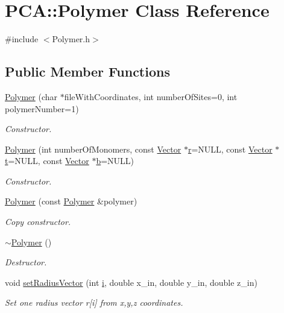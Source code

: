 \hypertarget{class_p_c_a_1_1_polymer}{}\section{P\+CA\+:\+:Polymer Class Reference}
\label{class_p_c_a_1_1_polymer}


{\ttfamily \#include $<$Polymer.\+h$>$}

\subsection*{Public Member Functions}
\begin{DoxyCompactItemize}
\item 
\hyperlink{class_p_c_a_1_1_polymer_a0553d45df48e7f0995063e9e74fcadb5}{Polymer} (char $\ast$file\+With\+Coordinates, int number\+Of\+Sites=0, int polymer\+Number=1)
\begin{DoxyCompactList}\small\item\em Constructor. \end{DoxyCompactList}\item 
\hyperlink{class_p_c_a_1_1_polymer_ac2645c33eba98a8ec1670d69b92060c8}{Polymer} (int number\+Of\+Monomers, const \hyperlink{class_p_c_a_1_1_vector}{Vector} $\ast$\hyperlink{class_p_c_a_1_1_polymer_a9822e3b9c3420a04a689706b84e586ca}{r}=N\+U\+LL, const \hyperlink{class_p_c_a_1_1_vector}{Vector} $\ast$\hyperlink{class_p_c_a_1_1_polymer_a0fd79e19a8c09a9e4c72903924151b5e}{t}=N\+U\+LL, const \hyperlink{class_p_c_a_1_1_vector}{Vector} $\ast$\hyperlink{class_p_c_a_1_1_polymer_ad93199b0187ab557476153b204b921c7}{b}=N\+U\+LL)
\begin{DoxyCompactList}\small\item\em Constructor. \end{DoxyCompactList}\item 
\hyperlink{class_p_c_a_1_1_polymer_a1ce99540db06e9e48392423ba516cd2f}{Polymer} (const \hyperlink{class_p_c_a_1_1_polymer}{Polymer} \&polymer)
\begin{DoxyCompactList}\small\item\em Copy constructor. \end{DoxyCompactList}\item 
\hyperlink{class_p_c_a_1_1_polymer_ac0d31fa5c6bee720f8069805d6669606}{$\sim$\+Polymer} ()
\begin{DoxyCompactList}\small\item\em Destructor. \end{DoxyCompactList}\item 
void \hyperlink{class_p_c_a_1_1_polymer_a0c6e93aa35271b98d92a38afd2b0913d}{set\+Radius\+Vector} (int \hyperlink{scaling_picture__new_8m_a6f6ccfcf58b31cb6412107d9d5281426}{i}, double x\+\_\+in, double y\+\_\+in, double z\+\_\+in)
\begin{DoxyCompactList}\small\item\em Set one radius vector r\mbox{[}i\mbox{]} from x,y,z coordinates. \end{DoxyCompactList}\end{DoxyCompactItemize}

